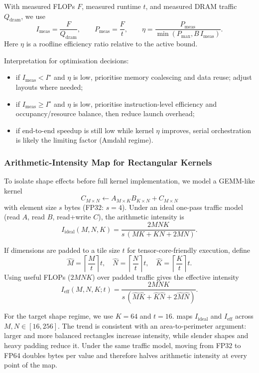 With measured FLOPs $F$, measured runtime $t$, and measured DRAM traffic
$Q_{\mathrm{dram}}$, we use
\[
  I_{\mathrm{meas}}=\frac{F}{Q_{\mathrm{dram}}},\qquad
  P_{\mathrm{meas}}=\frac{F}{t},\qquad
  \eta=\frac{P_{\mathrm{meas}}}{\min(P_{\max},B\,I_{\mathrm{meas}})}.
\]
Here $\eta$ is a roofline efficiency ratio relative to the active bound.

Interpretation for optimisation decisions:
\begin{itemize}
  \item if $I_{\mathrm{meas}}<I^\star$ and $\eta$ is low, prioritise memory
    coalescing and data reuse; adjust layouts where needed;
  \item if $I_{\mathrm{meas}}\ge I^\star$ and $\eta$ is low, prioritise
    instruction-level efficiency and occupancy/resource balance, then reduce
    launch overhead;
  \item if end-to-end speedup is still low while kernel $\eta$ improves,
    serial orchestration is likely the limiting factor (Amdahl regime).
\end{itemize}

\subsubsection{Arithmetic-Intensity Map for Rectangular Kernels}
\label{sec:ai-landscape}

To isolate shape effects before full kernel implementation, we model a GEMM-like
kernel
\[
  C_{M\times N} \leftarrow A_{M\times K}B_{K\times N} + C_{M\times N}
\]
with element size $s$ bytes (FP32: $s=4$). Under an ideal one-pass traffic
model (read $A$, read $B$, read+write $C$), the arithmetic intensity is
\[
  I_{\mathrm{ideal}}(M,N,K)=
  \frac{2MNK}{s\,(MK+KN+2MN)}.
\]

If dimensions are padded to a tile size $t$ for tensor-core-friendly execution,
define
\[
  \hat M = \left\lceil \frac{M}{t}\right\rceil t,\quad
  \hat N = \left\lceil \frac{N}{t}\right\rceil t,\quad
  \hat K = \left\lceil \frac{K}{t}\right\rceil t.
\]
Using useful FLOPs ($2MNK$) over padded traffic gives the effective intensity
\[
  I_{\mathrm{eff}}(M,N,K;t)=
  \frac{2MNK}{s\,(\hat M\hat K+\hat K\hat N+2\hat M\hat N)}.
\]

For the target shape regime, we use $K=64$ and $t=16$.
 maps
$I_{\mathrm{ideal}}$ and $I_{\mathrm{eff}}$ across $M,N\in[16,256]$. The trend
is consistent with an area-to-perimeter argument: larger and more balanced
rectangles increase intensity, while slender shapes and heavy padding reduce
it. Under the same traffic model, moving from FP32 to FP64 doubles bytes per
value and therefore halves arithmetic intensity at every point of the map.

